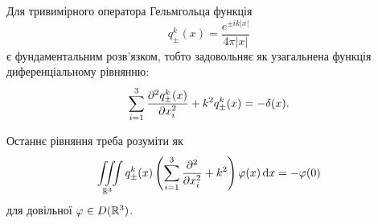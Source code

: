 \begin{theorem}
	Для тривимірного оператора Гельмгольца функція
	\begin{equation}
		q_\pm^k(x) = \frac{e^{\pm ik|x|}}{4 \pi |x|}
	\end{equation}
	є фундаментальним розв'язком, тобто задовольняє як узагальнена функція диференціальному рівнянню:
	\begin{equation}
		\displaystyle\sum\limits_{i = 1}^3 \frac{\partial^2 q_\pm^k (x)}{\partial x_i^2} + k^2 q_\pm^k(x) = - \delta(x).
	\end{equation}
\end{theorem}

\begin{remark}
	Останнє рівняння треба розуміти як
	\begin{equation}
		\displaystyle\iiint\limits_{\mathbb{R}^3} q_\pm^k(x) \left( \displaystyle\sum\limits_{i = 1}^3 \frac{\partial^2}{\partial x_i^2} + k^2 \right) \varphi(x) \mathop{}\!\mathrm{d} x = - \varphi(0)
	\end{equation}
	для довільної $\varphi \in D(\mathbb{R}^3)$.
\end{remark}

